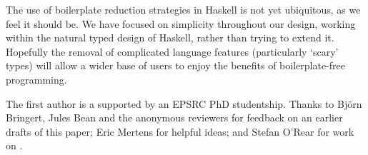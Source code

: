 The use of boilerplate reduction strategies in Haskell is not yet ubiquitous, as we feel it should be. We have focused on simplicity throughout our design, working within the natural typed design of Haskell, rather than trying to extend it. Hopefully the removal of complicated language features (particularly `scary' types) will allow a wider base of users to enjoy the benefits of boilerplate-free programming.


The first author is a supported by an EPSRC PhD studentship. Thanks to Bj\"{o}rn Bringert, Jules Bean and the anonymous reviewers for feedback on an earlier drafts of this paper; Eric Mertens for helpful ideas; and Stefan O'Rear for work on \derive{}.
